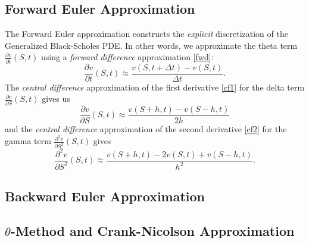 \subsection{Forward Euler Approximation}
The Forward Euler approximation constructs the \textit{explicit} discretization of the Generalized Black-Scholes PDE. In other words, we approximate the theta term $\frac{\partial v}{\partial t}(S,t)$ using a \textit{forward difference} approximation \eqref{fwd}:
$$\frac{\partial v}{\partial t}(S,t) \approx \frac{v(S,t+\Delta t)-v(S,t)}{\Delta t}.$$
The \textit{central difference} approximation of the first derivative \eqref{cf1} for the delta term $\frac{\partial v}{\partial S}(S,t)$ gives us
$$\frac{\partial v}{\partial S}(S,t) \approx \frac{v(S+h,t)-v(S-h,t)}{2h}$$
and the \textit{central difference} approximation of the second derivative \eqref{cf2} for the gamma term $\frac{\partial^2 v}{\partial S^2}(S,t)$ gives
$$\frac{\partial^2 v}{\partial S^2}(S,t) \approx \frac{v(S+h,t)-2 v(S,t)+v(S-h,t)}{h^2}.$$

\subsection{Backward Euler Approximation}

\subsection{$\theta$-Method and Crank-Nicolson Approximation}
